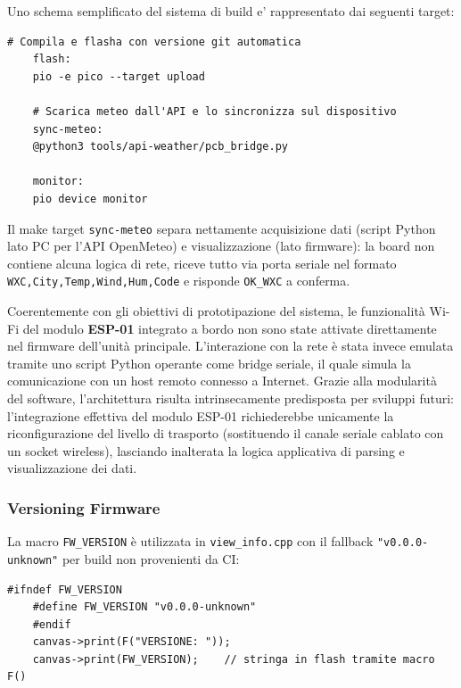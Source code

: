 Uno schema semplificato del sistema di build e' rappresentato dai seguenti target:

\begin{lstlisting}[style=makefile, caption={Makefile --- target di sviluppo}]
	# Compila e flasha con versione git automatica
	flash:
	pio -e pico --target upload
	
	# Scarica meteo dall'API e lo sincronizza sul dispositivo
	sync-meteo:
	@python3 tools/api-weather/pcb_bridge.py
	
	monitor:
	pio device monitor
\end{lstlisting}


Il make target \texttt{sync-meteo} separa nettamente acquisizione dati (script Python lato PC per l'API OpenMeteo) e visualizzazione (lato firmware): la board non contiene alcuna logica di rete, riceve tutto via porta seriale nel formato \texttt{WXC,City,Temp,Wind,Hum,Code} e risponde \texttt{OK\_WXC} a conferma.


Coerentemente con gli obiettivi di prototipazione del sistema, le funzionalità Wi-Fi del modulo \textbf{ESP-01} integrato a bordo non sono state attivate direttamente nel firmware dell'unità principale. L'interazione con la rete è stata invece emulata tramite uno script Python operante come bridge seriale, il quale simula la comunicazione con un host remoto connesso a Internet. Grazie alla modularità del software, l'architettura risulta intrinsecamente predisposta per sviluppi futuri: l'integrazione effettiva del modulo ESP-01 richiederebbe unicamente la riconfigurazione del livello di trasporto (sostituendo il canale seriale cablato con un socket wireless), lasciando inalterata la logica applicativa di parsing e visualizzazione dei dati.

\subsubsection*{Versioning Firmware}

La macro \texttt{FW\_VERSION} è utilizzata in \texttt{view\_info.cpp} con
il fallback \texttt{"v0.0.0-unknown"} per build non provenienti da CI:

\begin{lstlisting}[caption={view\_info.cpp --- versione iniettata a compile-time}]
	#ifndef FW_VERSION
	#define FW_VERSION "v0.0.0-unknown"
	#endif
	canvas->print(F("VERSIONE: "));
	canvas->print(FW_VERSION);    // stringa in flash tramite macro F()
\end{lstlisting}

